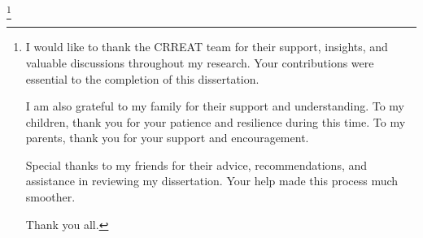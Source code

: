 

\thanks{
I would like to thank the CRREAT team for their support, insights, and valuable discussions throughout my research. Your contributions were essential to the completion of this dissertation.

I am also grateful to my family for their support and understanding. To my children, thank you for your patience and resilience during this time. To my parents, thank you for your support and encouragement.

Special thanks to my friends for their advice, recommendations, and assistance in reviewing my dissertation. Your help made this process much smoother.

Thank you all.
}

\def\mycite[#1]{{\null\def\_addcitelist##1{}\nonumcitations\unskip\cite[#1]}}
\def\specialbibs{\bibnum=1000
   \def\_printbib{\hangindent=2\iindent
      \noindent\hskip2\iindent \llap{[\the\bibmark] }}%
}


\def\printcaption#1#2{\leftskip=\iindent \rightskip=\iindent
   \setbox0=\hbox\bgroup \aftergroup\docaption{\bf#1 #2.}\enspace}
\def\docaption{\tmpdim=\hsize \advance\tmpdim by-2\iindent
   \ifdim\wd0>\tmpdim \unhbox0 \else \hfil\hfil\unhbox0 \fi \endgraf \egroup}










